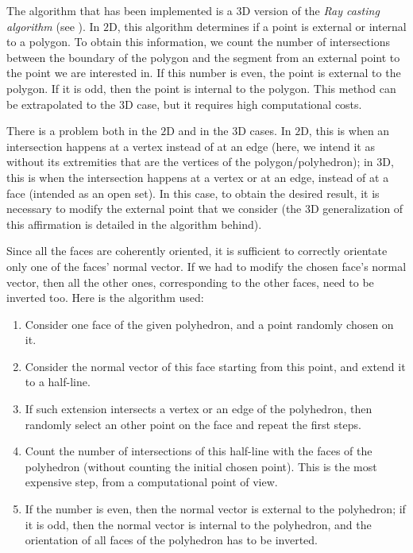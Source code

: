 The algorithm that has been implemented is a $3$D version of the \textit{Ray casting algorithm} (see \cite{rayCasting}). In $2$D, this algorithm determines if a point is external or internal to a polygon. To obtain this information, we count the number of intersections between the boundary of the polygon and the segment from an external point to the point we are interested in. If this number is even, the point is external to the polygon. If it is odd, then the point is internal to the polygon. This method can be extrapolated to the $3$D case, but it requires high computational costs. 

There is a problem both in the $2$D and in the $3$D cases. In $2$D, this is when an intersection happens at a vertex instead of at an edge (here, we intend it as without its extremities that are the vertices of the polygon/polyhedron); in $3$D, this is when the intersection happens at a vertex or at an edge, instead of at a face (intended as an open set). In this case, to obtain the desired result, it is necessary to modify the external point that we consider (the $3$D generalization of this affirmation is detailed in the algorithm behind). 

Since all the faces are coherently oriented, it is sufficient to correctly orientate only one of the faces' normal vector. If we had to modify the chosen face's normal vector, then all the other ones, corresponding to the other faces, need to be inverted too. Here is the algorithm used:
\begin{enumerate}
\item Consider one face of the given polyhedron, and a point randomly chosen on it. 
\item Consider the normal vector of this face starting from this point, and extend it to a half-line. 
\item If such extension intersects a vertex or an edge of the polyhedron, then randomly select an other point on the face and repeat the first steps.
\item Count the number of intersections of this half-line with the faces of the polyhedron (without counting the initial chosen point). This is the most expensive step, from a computational point of view. 
\item If the number is even, then the normal vector is external to the polyhedron; if it is odd, then the normal vector is internal to the polyhedron, and the orientation of all faces of the polyhedron has to be inverted.
\end{enumerate}


